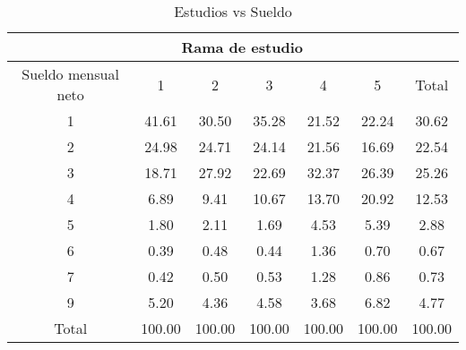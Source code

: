 \documentclass{article}
\begin{document}
\begin{table}[]
\centering
\caption{Estudios vs Sueldo}
\begin{tabular}{c|ccccc|c}  \hline  \hline
                                & \multicolumn{4}{c|}{Rama de estudio}                        &                                            \\  \hline
Sueldo mensual neto  & 1      & 2      & 3      & 4                    & 5                   & Total                \\\hline  
1                               & 41.61  & 30.50  & 35.28  & 21.52                & 22.24               & 30.62                \\
2                               & 24.98  & 24.71  & 24.14  & 21.56                & 16.69               & 22.54                \\
3                               & 18.71  & 27.92  & 22.69  & 32.37                & 26.39               & 25.26                \\
4                               & 6.89   & 9.41   & 10.67  & 13.70                & 20.92               & 12.53                \\
5                               & 1.80   & 2.11   & 1.69   & 4.53                 & 5.39                & 2.88                 \\
6                               & 0.39   & 0.48   & 0.44   & 1.36                 & 0.70                & 0.67                 \\
7                               & 0.42   & 0.50   & 0.53   & 1.28                 & 0.86                & 0.73                 \\
9                               & 5.20   & 4.36   & 4.58   & 3.68                 & 6.82                & 4.77                 \\
Total                           & 100.00 & 100.00 & 100.00 & 100.00               & 100.00              & 100.00        \\  \hline  \hline      
\end{tabular}
\end{table}
\end{document}
